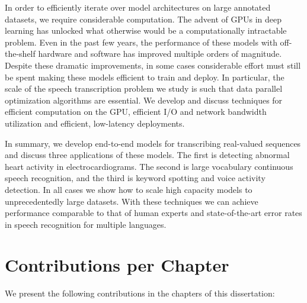 In order to efficiently iterate over model architectures on large annotated
datasets, we require considerable computation. The advent of GPUs in deep
learning has unlocked what otherwise would be a computationally intractable
problem. Even in the past few years, the performance of these models with
off-the-shelf hardware and software has improved multiple orders of magnitude.
Despite these dramatic improvements, in some cases considerable effort must
still be spent making these models efficient to train and deploy.  In
particular, the scale of the speech transcription problem we study is such that
data parallel optimization algorithms are essential. We develop and discuss
techniques for efficient computation on the GPU, efficient I/O and network
bandwidth utilization and efficient, low-latency deployments.

In summary, we develop end-to-end models for transcribing real-valued sequences
and discuss three applications of these models. The first is detecting abnormal
heart activity in electrocardiograms. The second is large vocabulary continuous
speech recognition, and the third is keyword spotting and voice activity
detection. In all cases we show how to scale high capacity models to
unprecedentedly large datasets. With these techniques we can achieve
performance comparable to that of human experts and state-of-the-art error
rates in speech recognition for multiple languages.

\section{Contributions per Chapter}

We present the following contributions in the chapters of this dissertation:


